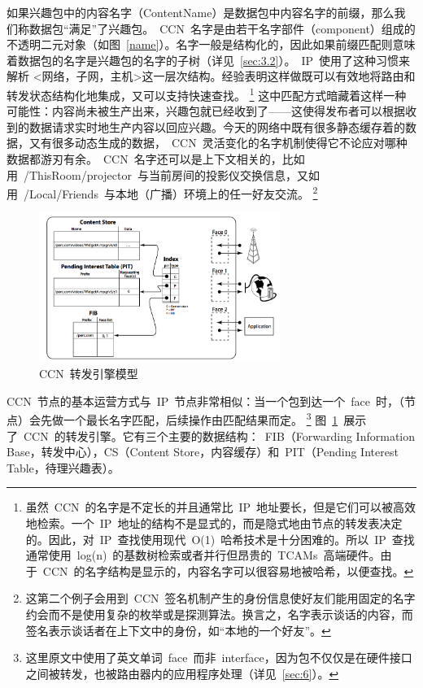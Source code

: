 如果兴趣包中的内容名字（ContentName）是数据包中内容名字的前缀，那么我们称数据包“满足”了兴趣包。~CCN~名字是由若干名字部件（component）组成的不透明二元对象（如图~\ref{name}）。名字一般是结构化的，因此如果前缀匹配则意味着数据包的名字是兴趣包的名字的子树（详见~\ref{sec:3.2}）。~IP~使用了这种习惯来解析 <网络，子网，主机>这一层次结构。经验表明这样做既可以有效地将路由和转发状态结构化地集成，又可以支持快速查找。%
\renewcommand\baselinestretch{1} %
\footnote{虽然~CCN~的名字是不定长的并且通常比~IP~地址要长，但是它们可以被高效地检索。一个~IP~地址的结构不是显式的，而是隐式地由节点的转发表决定的。因此，对~IP~查找使用现代~O(1)~哈希技术是十分困难的。所以~IP~查找通常使用~log(n)~的基数树检索或者并行但昂贵的~TCAMs~高端硬件。由于~CCN~的名字结构是显示的，内容名字可以很容易地被哈希，以便查找。}
这中匹配方式暗藏着这样一种可能性：内容尚未被生产出来，兴趣包就已经收到了——这使得发布者可以根据收到的数据请求实时地生产内容以回应兴趣。今天的网络中既有很多静态缓存着的数据，又有很多动态生成的数据，~CCN~灵活变化的名字机制使得它不论应对哪种数据都游刃有余。~CCN~名字还可以是上下文相关的，比如用~/ThisRoom/projector~与当前房间的投影仪交换信息，又如用~/Local/Friends~与本地（广播）环境上的任一好友交流。
\renewcommand\baselinestretch{1} %
\footnote{这第二个例子会用到~CCN~签名机制产生的身份信息使好友们能用固定的名字约会而不是使用复杂的枚举或是探测算法。换言之，名字表示谈话的内容，而签名表示谈话者在上下文中的身份，如“本地的一个好友”。}

\begin{figure}
  \centering
  \includegraphics[width=0.7\textwidth]{images/engine}
  \caption{CCN~转发引擎模型} 
  \label{engine}
\end{figure}

CCN~节点的基本运营方式与~IP~节点非常相似：当一个包到达一个~face~时，（节点）会先做一个最长名字匹配，后续操作由匹配结果而定。
\renewcommand\baselinestretch{1} %
\footnote{这里原文中使用了英文单词~face~而非~interface，因为包不仅仅是在硬件接口之间被转发，也被路由器内的应用程序处理（详见~\ref{sec:6}）。}
图~\ref{engine}~展示了~CCN~的转发引擎。它有三个主要的数据结构：~FIB（Forwarding Information Base，转发中心），CS（Content Store，内容缓存）和~PIT（Pending Interest Table，待理兴趣表）。

